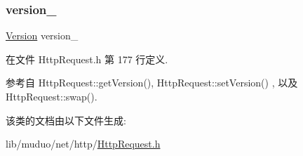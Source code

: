 \subsubsection{\texorpdfstring{version\+\_\+}{version\_}}
{\footnotesize\ttfamily \hyperlink{classmuduo_1_1net_1_1HttpRequest_a2256f5bba1c1c69a92b933aa501df470}{Version} version\+\_\+\hspace{0.3cm}{\ttfamily [private]}}



在文件 Http\+Request.\+h 第 177 行定义.



参考自 Http\+Request\+::get\+Version(), Http\+Request\+::set\+Version() , 以及 Http\+Request\+::swap().



该类的文档由以下文件生成\+:\begin{DoxyCompactItemize}
\item 
lib/muduo/net/http/\hyperlink{HttpRequest_8h}{Http\+Request.\+h}\end{DoxyCompactItemize}

